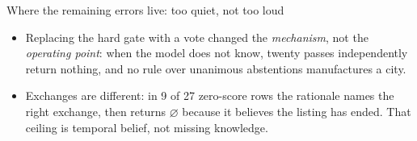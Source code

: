\documentclass[aspectratio=169,10pt]{beamer}
\newcommand{\ok}{\textcolor{good}{\faCheck}}
\newcommand{\no}{\textcolor{bad}{\faTimes}}
\begin{document}
\begin{frame}{Where the remaining errors live: too quiet, not too loud}
  \centering

  \vspace{4mm}
  \begin{itemize}
    \item Replacing the hard gate with a vote changed the \emph{mechanism},
      not the \emph{operating point}: when the model does not know, twenty
      passes independently return nothing, and no rule over unanimous
      abstentions manufactures a city.
    \item Exchanges are different: in 9 of 27 zero-score rows the rationale
      names the right exchange, then returns $\varnothing$ because it believes
      the listing has ended. That ceiling is temporal belief, not missing
      knowledge.
  \end{itemize}
\end{frame}
\end{document}
